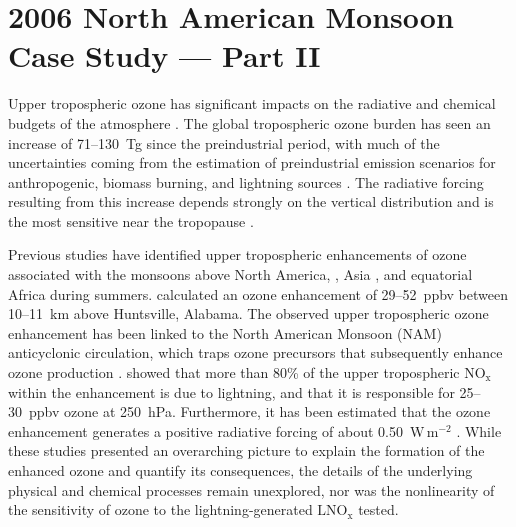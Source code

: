 \chapter{2006 North American Monsoon Case Study --- Part II} \label{ch:2006_5}
\ifpdf
    \graphicspath{{Chapter_2006/figures/PNG/}{Chapter_2006/figures/PDF/}{Chapter_2006/}}
\else
    \graphicspath{{Chapter_2006/figures/EPS/}{Chapter_2006/}}
\fi

Upper tropospheric ozone has significant impacts on the radiative and chemical budgets of
the atmosphere \citep{Kiehl:1999uq}. The global tropospheric ozone burden has seen an
increase of 71--130~Tg since the preindustrial period, with much of the uncertainties
coming from the estimation of preindustrial emission scenarios for anthropogenic, biomass
burning, and lightning sources \citep[][and references therein]{Lamarque:2005gb}. The
radiative forcing resulting from this increase depends strongly on the vertical distribution and
is the most sensitive near the tropopause \citep{Lacis:1990fk}.

Previous studies have identified upper tropospheric enhancements of ozone associated with the monsoons above North America,
\citep[][and references therein]{Li:2005ss,Cooper:2009nx}, Asia \citep{Park:2007bh,Worden:2009ve},
and equatorial Africa \citep{Bouarar:2011ly} during summers.
\citet{Cooper:2007cr} calculated an ozone enhancement of 29--52~ppbv between 10--11~km
above Huntsville, Alabama. The observed upper tropospheric ozone enhancement has
been linked to the North American Monsoon (NAM) anticyclonic circulation, which traps ozone
precursors that subsequently enhance ozone production \citep{Li:2005ss}. \citet{Cooper:2009nx}
showed that more than 80\% of the upper tropospheric NO$_\mathrm{x}$ within the enhancement
is due to lightning, and that it is responsible for 25--30~ppbv ozone at 250~hPa. Furthermore,
it has been estimated that the ozone enhancement generates a positive radiative forcing of about
0.50~W\,m$^{-2}$ \citep{Cooper:2007cr,Choi:2009bh}. While these studies presented an overarching
picture to explain the formation of the enhanced ozone and quantify its consequences, the details
of the underlying physical and chemical processes remain unexplored, nor was the nonlinearity
of the sensitivity of ozone to the lightning-generated $\mathrm{LNO_x}$ tested.

